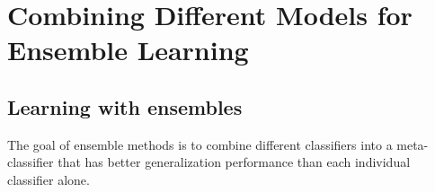 \chapter{Combining Different Models for Ensemble Learning\label{Ch07}}
\section{Learning with ensembles}
The goal of ensemble methods is to combine different classifiers into a meta-classifier that has better generalization performance than each individual classifier alone.